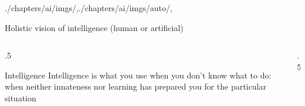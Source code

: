 \begin{graphicspathcontext}{{./chapters/ai/imgs/},{./chapters/ai/imgs/auto/},\old}

\begin{frame}[c]{Holistic vision of intelligence (human or artificial)}
	\begin{columns}
		\begin{column}{.5\linewidth}
			\begin{definitionblock}{Intelligence \cite{piaget1947psychologie}}
				Intelligence is what you use when you don't know what to do: when neither innateness nor learning has prepared you for the particular situation
			\end{definitionblock}
		\end{column}
		\begin{column}{.5\linewidth}
			\hfill
			 \\[.5cm]
			\hfill
		\end{column}
	\end{columns}
\end{frame}

\end{graphicspathcontext}

\endinput

